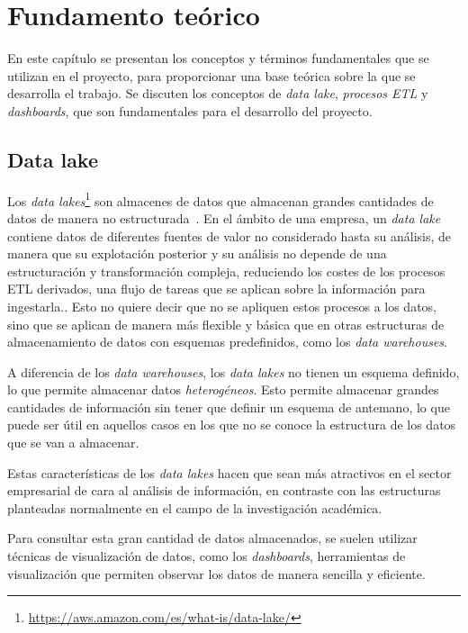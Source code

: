 \chapter{Fundamento teórico}\label{chap:teoria}
En este capítulo se presentan los conceptos y términos fundamentales que se utilizan en el
proyecto, para proporcionar una base teórica sobre la que se desarrolla el trabajo. Se discuten
los conceptos de \textit{data lake}, \textit{procesos ETL} y \textit{dashboards}, que son
fundamentales para el desarrollo del proyecto.

\section{Data lake}\label{sec:datalake}
Los \textit{data lakes}\footnote{\url{https://aws.amazon.com/es/what-is/data-lake/}}
son almacenes de datos que almacenan grandes cantidades de datos de manera no
estructurada~\cite{mier2023dashboards}. En el ámbito de una empresa, un \textit{data lake}
contiene datos de diferentes fuentes de valor no considerado hasta su análisis, de manera
que su explotación posterior y su análisis no depende de una estructuración y transformación
compleja, reduciendo los costes de los procesos ETL derivados, una flujo de tareas que se
aplican sobre la información para ingestarla.. Esto
no quiere decir que no se apliquen estos procesos a los datos, sino que se aplican de manera
más flexible y básica que en otras estructuras de almacenamiento de datos con esquemas
predefinidos, como los \textit{data warehouses}.~\cite{pwint2018data}

A diferencia de los \textit{data warehouses}, los \textit{data lakes} no tienen un
esquema definido, lo que permite almacenar datos \textit{heterogéneos}. Esto permite
almacenar grandes cantidades de información sin tener que definir un esquema de antemano,
lo que puede ser útil en aquellos casos en los que no se conoce la estructura de los
datos que se van a almacenar.

Estas características de los \textit{data lakes} hacen que sean más atractivos en el sector
empresarial de cara al análisis de información, en contraste con las estructuras planteadas
normalmente en el campo de la investigación académica.

Para consultar esta gran cantidad de datos almacenados, se suelen utilizar técnicas de
visualización de datos, como los \textit{dashboards}, herramientas de visualización que
permiten observar los datos de manera sencilla y eficiente.

